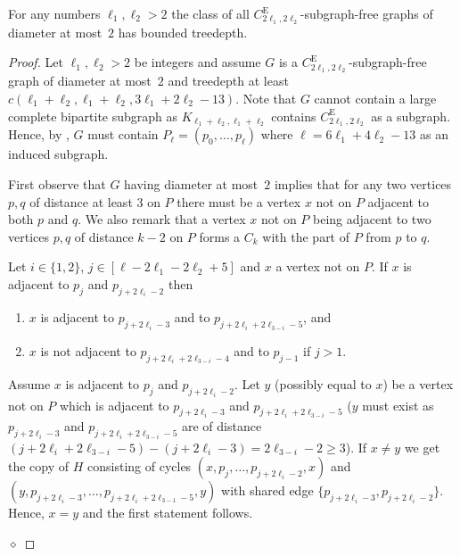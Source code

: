 \documentclass[runningheads,envcountsame]{llncs}
\newcommand{\sharedEdge}[1]{C^{\mathrm{E}}_{#1}}
\newenvironment{claimproof}
{\noindent {\em Proof of Claim:} }
{\hfill $\diamond$ \smallskip}
\begin{document}
\begin{theorem}
\label{thm:CEtwoLength}
    For any numbers $\ell_1,\ell_2>2$ the class of all $\sharedEdge{2\ell_1,2\ell_2}$-subgraph-free graphs of diameter at most~$2$ has bounded treedepth.
\end{theorem}
\begin{proof}
     Let $\ell_1,\ell_2>2$ be integers and assume $G$ is a $\sharedEdge{2\ell_1,2\ell_2}$-subgraph-free graph of diameter at most~$2$ and  treedepth at least $c(\ell_1+\ell_2,\ell_1+\ell_2,3\ell_1+2\ell_2-13)$. Note that $G$ cannot contain a large complete bipartite subgraph as $K_{\ell_1+\ell_2,\ell_1+\ell_2}$ contains $\sharedEdge{2\ell_1,2\ell_2}$ as a subgraph. Hence, by , $G$ must contain $P_\ell=(p_0,\dots,p_\ell)$ where $\ell=6\ell_1+4\ell_2-13$ as an induced subgraph.

     First observe that $G$ having diameter at most~$2$ implies that for any two vertices $p,q$ of distance at least 3 on $P$ there must be a vertex $x$ not on $P$ adjacent to both $p$ and $q$. We also remark that a vertex $x$ not on $P$ being adjacent to two vertices $p,q$ of distance $k-2$ on $P$ forms a $C_k$ with the part of $P$ from $p$ to $q$.
     \begin{mclaim}\label{claim:impliedAdjCE}
        Let $i\in \{1,2\}$, $j\in [\ell-2\ell_1-2\ell_2+5]$ and $x$ a vertex not on $P$.
         If  $x$ is adjacent to $p_j$ and $p_{j+2\ell_i-2}$ then 
         \begin{enumerate}
             \item $x$ is adjacent to $p_{j+2\ell_i-3}$ and to $p_{j+2\ell_i+2\ell_{3-i}-5}$, and
             \item $x$ is not adjacent to $p_{j+2\ell_i+2\ell_{3-i}-4}$ and to $p_{j-1}$ if $j>1$.
         \end{enumerate}
     \end{mclaim}
     \begin{claimproof}
         Assume $x$ is adjacent to $p_j$ and $p_{j+2\ell_i-2}$. Let $y$ (possibly equal to $x$) be a vertex not on $P$ which is adjacent to $p_{j+2\ell_i-3}$ and $p_{j+2\ell_i+2\ell_{3-i}-5}$ ($y$ must exist as $p_{j+2\ell_i-3}$ and $p_{j+2\ell_i+2\ell_{3-i}-5}$ are of distance $(j+2\ell_i+2\ell_{3-i}-5) - (j+2\ell_i-3)=2\ell_{3-i}-2\geq 3$). If $x\not=y$ we get the copy of $H$ consisting of cycles $(x,p_j,\dots, p_{j+2\ell_i-2},x)$ and $(y,p_{j+2\ell_i-3},\dots, p_{j+2\ell_i+2\ell_{3-1}-5},y)$ with shared edge $\{p_{j+2\ell_i-3},p_{j+2\ell_i-2}\}$. Hence, $x=y$ and the first statement follows. 
         

\end{claimproof}
\end{proof}
\end{document}
